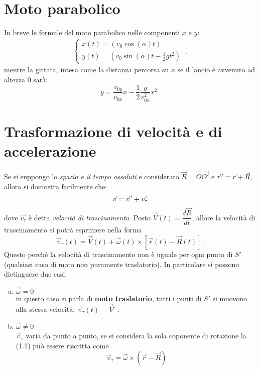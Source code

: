 \documentclass[12pt, oneside]{book}
\newcommand{\pvec}[1]{\vec{#1}\mkern2mu\vphantom{#1}}
\begin{document}
\section{Moto parabolico}
In breve le formule del moto parabolico nelle componenti $x$ e $y$:
\begin{align*}
	\begin{cases}
		x(t)=(v_0 \cos(\alpha)t)\\
		y(t)=(v_0 \sin(\alpha)t-\frac{1}{2}gt^2)
	\end{cases}~,
\end{align*}
mentre la gittata, intesa come la distanza percorsa su $x$ se il lancio è avvenuto ad altezza 0 sarà:
\[y=\dfrac{v_{0y}}{v_{0x}}x-\dfrac{1}{2}\dfrac{g}{v_{0x}^2}x^2~.\]

\section{Trasformazione di velocità e di accelerazione}
Se si suppongo lo \emph{spazio e il tempo assoluti} e considerato $\vec{R}=\overrightarrow{OO'}$ e $\pvec{r}'=\vec{r}+\vec{R}$, allora si domostra facilmente che:
\[\vec{v}=\pvec{v}'+\vec{v_\tau}\]
dove $\vec{v_\tau}$ è detta \emph{velocità di trascinamento}.
Posto $\vec{V}(t)=\dfrac{d\vec{R}}{dt}$, allore la velocità di trascinamento si potrà esprimere nella forma
\begin{equation}
\vec{v}_\tau(t)=\vec{V}(t)+\vec{\omega}(t)\times[\vec{r}(t)-\vec{R}(t)]~.
\end{equation}
Questo perché la velocità di trascinamento non è uguale per ogni punto di $S'$ (qualsiasi caso di moto non puramente traslatorio). In particolare si possono dietinguere due casi:
\begin{enumerate}[a)]
	\item $\vec{\omega}=0$\\
	in questo caso si parla di \textbf{moto traslatorio}, tutti i punti di $S'$ si muovono alla stessa velocità: $\vec{v}_\tau(t)=\vec{V}$~;
	\item $\vec{\omega}\neq 0$\\
	$\vec{v}_\tau$ varia da punto a punto, se si considera la sola coponente di rotazione la (1.1) può essere riscritta come
	\[\vec{v}_\tau=\vec{\omega}\times(\vec{r}-\vec{R})\]
\end{enumerate}
\end{document}
